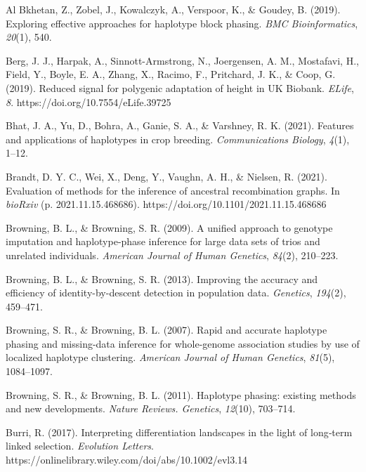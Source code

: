 \documentclass[twocolumn]{bmcart}%
\begin{document}
\begin{backmatter}

\begin{hangparas}{1em}{1}

Al Bkhetan, Z., Zobel, J., Kowalczyk, A., Verspoor, K., \& Goudey, B.
(2019). Exploring effective approaches for haplotype block phasing.
\emph{BMC Bioinformatics}, \emph{20}(1), 540.

Berg, J. J., Harpak, A., Sinnott-Armstrong, N., Joergensen, A. M.,
Mostafavi, H., Field, Y., Boyle, E. A., Zhang, X., Racimo, F.,
Pritchard, J. K., \& Coop, G. (2019). Reduced signal for polygenic
adaptation of height in UK Biobank. \emph{ELife}, \emph{8}.
https://doi.org/10.7554/eLife.39725

Bhat, J. A., Yu, D., Bohra, A., Ganie, S. A., \& Varshney, R. K. (2021).
Features and applications of haplotypes in crop breeding.
\emph{Communications Biology}, \emph{4}(1), 1--12.

Brandt, D. Y. C., Wei, X., Deng, Y., Vaughn, A. H., \& Nielsen, R.
(2021). Evaluation of methods for the inference of ancestral
recombination graphs. In \emph{bioRxiv} (p. 2021.11.15.468686).
https://doi.org/10.1101/2021.11.15.468686

Browning, B. L., \& Browning, S. R. (2009). A unified approach to
genotype imputation and haplotype-phase inference for large data sets of
trios and unrelated individuals. \emph{American Journal of Human
Genetics}, \emph{84}(2), 210--223.

Browning, B. L., \& Browning, S. R. (2013). Improving the accuracy and
efficiency of identity-by-descent detection in population data.
\emph{Genetics}, \emph{194}(2), 459--471.

Browning, S. R., \& Browning, B. L. (2007). Rapid and accurate haplotype
phasing and missing-data inference for whole-genome association studies
by use of localized haplotype clustering. \emph{American Journal of
Human Genetics}, \emph{81}(5), 1084--1097.

Browning, S. R., \& Browning, B. L. (2011). Haplotype phasing: existing
methods and new developments. \emph{Nature Reviews. Genetics},
\emph{12}(10), 703--714.

Burri, R. (2017). Interpreting differentiation landscapes in the light
of long‐term linked selection. \emph{Evolution Letters}.
https://onlinelibrary.wiley.com/doi/abs/10.1002/evl3.14


\end{hangparas}
\end{backmatter}
\end{document}
